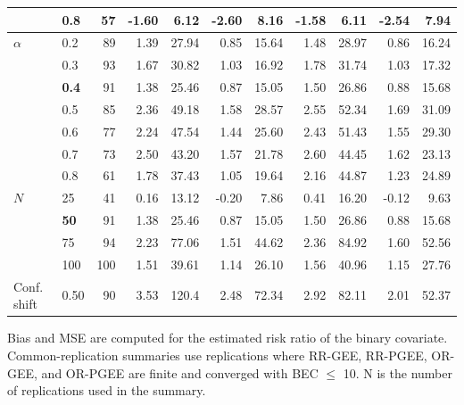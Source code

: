 \begin{table}[htbp]
\begin{tabular}{ll|rrr|rr|rr|rr}
 & 0.8 & 57 & -1.60 & 6.12 & -2.60 & 8.16 & -1.58 & 6.11 & -2.54 & 7.94 \\
\hline
$\alpha$ & 0.2 & 89 & 1.39 & 27.94 & 0.85 & 15.64 & 1.48 & 28.97 & 0.86 & 16.24 \\
 & 0.3 & 93 & 1.67 & 30.82 & 1.03 & 16.92 & 1.78 & 31.74 & 1.03 & 17.32 \\
 & \textbf{0.4} & 91 & 1.38 & 25.46 & 0.87 & 15.05 & 1.50 & 26.86 & 0.88 & 15.68 \\
 & 0.5 & 85 & 2.36 & 49.18 & 1.58 & 28.57 & 2.55 & 52.34 & 1.69 & 31.09 \\
 & 0.6 & 77 & 2.24 & 47.54 & 1.44 & 25.60 & 2.43 & 51.43 & 1.55 & 29.30 \\
 & 0.7 & 73 & 2.50 & 43.20 & 1.57 & 21.78 & 2.60 & 44.45 & 1.62 & 23.13 \\
 & 0.8 & 61 & 1.78 & 37.43 & 1.05 & 19.64 & 2.16 & 44.87 & 1.23 & 24.89 \\
\hline
$N$ & 25 & 41 & 0.16 & 13.12 & -0.20 & 7.86 & 0.41 & 16.20 & -0.12 & 9.63 \\
 & \textbf{50} & 91 & 1.38 & 25.46 & 0.87 & 15.05 & 1.50 & 26.86 & 0.88 & 15.68 \\
 & 75 & 94 & 2.23 & 77.06 & 1.51 & 44.62 & 2.36 & 84.92 & 1.60 & 52.56 \\
 & 100 & 100 & 1.51 & 39.61 & 1.14 & 26.10 & 1.56 & 40.96 & 1.15 & 27.76 \\
\hline
Conf. shift & 0.50 & 90 & 3.53 & 120.4 & 2.48 & 72.34 & 2.92 & 82.11 & 2.01 & 52.37 \\
\hline
\end{tabular}
\begin{flushleft}
\footnotesize Bias and MSE are computed for the estimated risk ratio of the binary covariate. Common-replication summaries use replications where RR-GEE, RR-PGEE, OR-GEE, and OR-PGEE are finite and converged with BEC $\leq$ 10. N is the number of replications used in the summary.
\end{flushleft}
\end{table}

